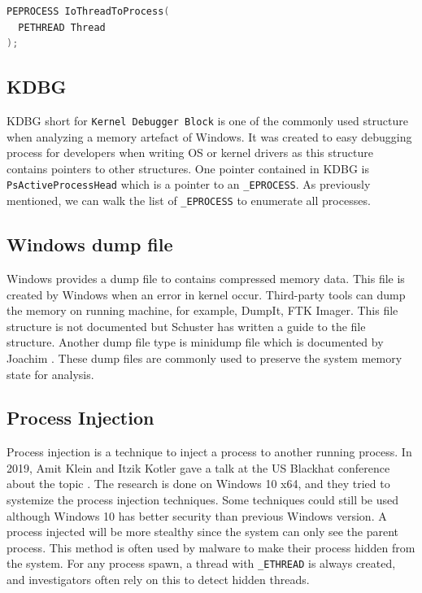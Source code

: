\begin{lstlisting}[language=cpp,caption={IoThreadToProcess},label={lst:threadtoprocess}]
PEPROCESS IoThreadToProcess(
  PETHREAD Thread
);
\end{lstlisting}

\subsection[KDBG]{KDBG}
\label{sec:kdbg}

KDBG short for \texttt{Kernel Debugger Block} is one of the commonly used structure when analyzing a memory artefact of Windows. It was created to easy debugging process for developers when writing OS or kernel drivers as this structure contains pointers to other structures. One pointer contained in KDBG is \texttt{PsActiveProcessHead} which is a pointer to an \texttt{\_EPROCESS}. As previously mentioned, we can walk the list of \texttt{\_EPROCESS} to enumerate all processes.

\subsection[Windows dump file]{Windows dump file}

Windows provides a dump file to contains compressed memory data. This file is created by Windows when an error in kernel occur. Third-party tools can dump the memory on running machine, for example, DumpIt, FTK Imager. This file structure is not documented but Schuster \cite{dmpfile} has written a guide to the file structure. Another dump file type is minidump file which is documented by Joachim \cite{mdmpfile}. These dump files are commonly used to preserve the system memory state for analysis.

\subsection[Process injection]{Process Injection}
\label{sec:processinjection}

Process injection is a technique to inject a process to another running process. In 2019, Amit Klein and Itzik Kotler gave a talk at the US Blackhat conference about the topic \cite{processinjection}. The research is done on Windows 10 x64, and they tried to systemize the process injection techniques. Some techniques could still be used although Windows 10 has better security than previous Windows version. A process injected will be more stealthy since the system can only see the parent process. This method is often used by malware to make their process hidden from the system. For any process spawn, a thread with \texttt{\_ETHREAD} is always created, and investigators often rely on this to detect hidden threads.


